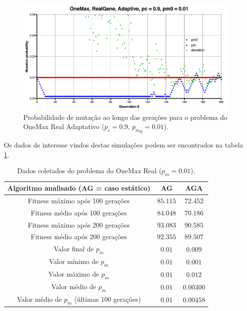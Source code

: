 \begin{figure}[ht!]
    \centering \includegraphics[width=1.0\textwidth]{onemax_real_adaptive_pm.jpg}
    \caption{Probabilidade de mutação ao longo das gerações para o problema do OneMax Real Adaptativo ($p_c=0.9$, ${p_m}_0=0.01$).}
    \label{fig:onemax_real_adaptive_pm}
\end{figure}

Os dados de interesse vindos destas simulações podem ser encontrados na tabela  \ref{tab:onemax_real}.

\begin{table}
\caption{Dados coletados do problema do OneMax Real ($p_m = 0.01$).}
\label{tab:onemax_real}

\center
\begin{tabular}{|c|cc|}
	\hline
	Algoritmo analisado (AG = caso estático) 	& AG		& AGA		\\
	\hline
	Fitness máximo após 100 gerações			& $85.115$	& $72.452$	\\
	Fitness médio após 100 gerações				& $84.048$	& $70.186$	\\
	Fitness máximo após 200 gerações 			& $93.083$	& $90.585$	\\
	Fitness médio após 200 gerações 			& $92.355$	& $89.507$	\\
	Valor final de $p_m$						& $0.01$ 	& $0.009$	\\
	Valor mínimo de $p_m$						& $0.01$	& $0.001$	\\
	Valor máximo de $p_m$						& $0.01$	& $0.012$	\\
	Valor médio de $p_m$						& $0.01$	& $0.00300$	\\
	Valor médio de $p_m$ (últimas 100 gerações)	& $0.01$	& $0.00458$	\\
	\hline
\end{tabular}
\end{table}

